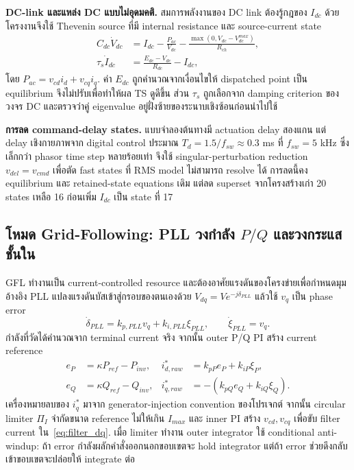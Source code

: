 \documentclass[12pt,a4paper]{article}
\begin{document}
\noindent\textbf{DC-link และแหล่ง DC แบบไม่อุดมคติ.} สมการพลังงานของ DC link ต้องรู้กฎของ $I_{dc}$ ด้วย โครงงานจึงใช้ Thevenin source ที่มี internal resistance และ source-current state
\begin{align}
C_{dc}\dot V_{dc}&=I_{dc}-\frac{P_{ac}}{V_{dc}}-\frac{\max(0,V_{dc}-V_{dc}^{max})}{R_{ch}},\\
\tau_s\dot I_{dc}&=\frac{E_{dc}-V_{dc}}{R_{dc}}-I_{dc},
\label{eq:dc_summary}
\end{align}
โดย $P_{ac}=v_{cd}i_d+v_{cq}i_q$. ค่า $E_{dc}$ ถูกคำนวณจากเงื่อนไขให้ dispatched point เป็น equilibrium จึงไม่ปรับเพื่อทำให้ผล TS ดูดีขึ้น ส่วน $\tau_s$ ถูกเลือกจาก damping criterion ของวงจร DC และตรวจว่าคู่ eigenvalue อยู่ฝั่งซ้ายของระนาบเชิงซ้อนก่อนนำไปใช้

\noindent\textbf{การลด command-delay states.} แบบจำลองต้นทางมี actuation delay สองแกน แต่ delay เชิงกายภาพจาก digital control ประมาณ $T_d=1.5/f_{sw}\approx0.3$ ms ที่ $f_{sw}=5$ kHz ซึ่งเล็กกว่า phasor time step หลายร้อยเท่า จึงใช้ singular-perturbation reduction $v_{del}=v_{cmd}$ เพื่อตัด fast states ที่ RMS model ไม่สามารถ resolve ได้ การลดนี้คง equilibrium และ retained-state equations เดิม แต่ลด superset จากโครงสร้างเก่า 20 states เหลือ 16 ก่อนเพิ่ม $I_{dc}$ เป็น state ที่ 17

\subsection{โหมด Grid-Following: PLL วงกำลัง $P/Q$ และวงกระแสชั้นใน}
GFL ทำงานเป็น current-controlled resource และต้องอาศัยแรงดันของโครงข่ายเพื่อกำหนดมุมอ้างอิง PLL แปลงแรงดันบัสเข้าสู่กรอบของตนเองด้วย $V_{dq}=Ve^{-j\delta_{PLL}}$ แล้วใช้ $v_q$ เป็น phase error
\begin{equation}
\dot\delta_{PLL}=k_{p,PLL}v_q+k_{i,PLL}\xi_{PLL},\qquad
\dot\xi_{PLL}=v_q.
\label{eq:gflpll}
\end{equation}
กำลังที่วัดได้คำนวณจาก terminal current จริง จากนั้น outer P/Q PI สร้าง current reference
\begin{align}
e_P&=\kappa P_{ref}-P_{inv},& i_{d,raw}^{*}&=k_{pP}e_P+k_{iP}\xi_P,\\
e_Q&=\kappa Q_{ref}-Q_{inv},& i_{q,raw}^{*}&=-\left(k_{pQ}e_Q+k_{iQ}\xi_Q\right).
\end{align}
เครื่องหมายลบของ $i_q^{*}$ มาจาก generator-injection convention ของโปรเจกต์ จากนั้น circular limiter $\Pi_I$ จำกัดขนาด reference ไม่ให้เกิน $I_{max}$ และ inner PI สร้าง $v_{cd},v_{cq}$ เพื่อขับ filter current ใน~\eqref{eq:filter_dq}. เมื่อ limiter ทำงาน outer integrator ใช้ conditional anti-windup: ถ้า error กำลังผลักคำสั่งออกนอกขอบเขตจะ hold integrator แต่ถ้า error ช่วยดึงกลับเข้าขอบเขตจะปล่อยให้ integrate ต่อ
\end{document}
